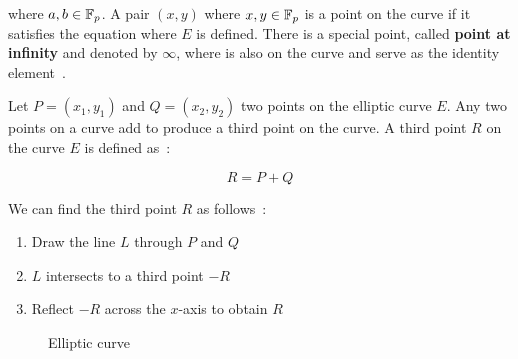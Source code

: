 where $a, b \in \mathbb{F}_p$. A pair $(x, y)$ where $x, y \in \mathbb{F}_p$ is a point on the curve if it satisfies the equation where $E$ is defined. There is a special point, called \textbf{point at infinity} and denoted by $\infty$, where is also on the curve and serve as the identity element~\cite{elliptic_curves_2}.

Let $P = (x_1, y_1)$ and $Q = (x_2, y_2)$ two points on the elliptic curve $E$. Any two points on a curve add to produce a third point on the curve. A third point $R$ on the curve $E$ is defined as~\cite{elliptic_curves}:

\begin{equation*}
  R = P + Q
\end{equation*}

We can find the third point $R$ as follows~\cite{elliptic_curves}:

\begin{enumerate}
  \item Draw the line $L$ through $P$ and $Q$
  \item $L$ intersects to a third point $-R$
  \item Reflect $-R$ across the $x$-axis to obtain $R$
\end{enumerate}

\begin{figure}
  \centering
  \caption{Elliptic curve}
\end{figure}

